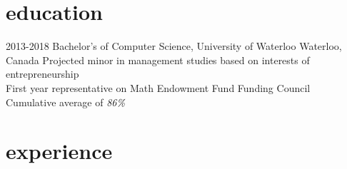 \documentclass[]{friggeri-cv-short}
\newcommand{\imp}[1] {{\em #1}}
\begin{document}
\section{education}
\begin{entrylist}
  \entry
    {2013-2018}
    {Bachelor's of Computer Science, University of Waterloo}
    {Waterloo, Canada}
	{Projected minor in management studies based on interests of entrepreneurship \\
	First year representative on Math Endowment Fund Funding Council \\
 Cumulative average of \imp{86\%}}
	
\end{entrylist}

\section{experience}
\end{document}
